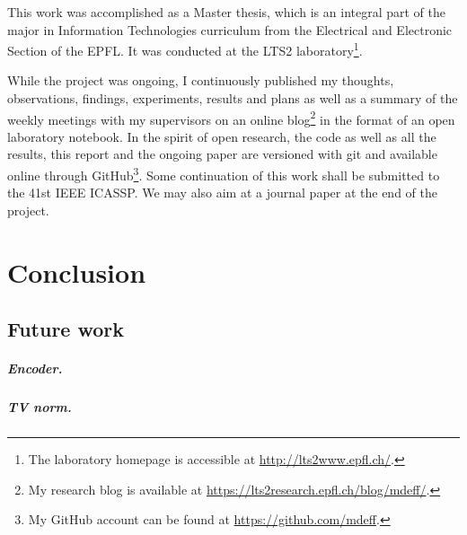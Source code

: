 \documentclass[a4paper,12pt,twoside]{report}
\begin{document}
This work was accomplished as a Master thesis, which is an integral part of the major in Information Technologies curriculum from the Electrical and Electronic Section of the \gls{EPFL}. It was conducted at the LTS2 laboratory\footnote{The laboratory homepage is accessible at \url{http://lts2www.epfl.ch/}.}.

While the project was ongoing, I continuously published my thoughts, observations, findings, experiments, results and plans as well as a summary of the weekly meetings with my supervisors on an online blog\footnote{My research blog is available at \url{https://lts2research.epfl.ch/blog/mdeff/}.} in the format of an open laboratory notebook. In the spirit of open research, the code as well as all the results, this report and the ongoing paper are versioned with git and available online through GitHub\footnote{My GitHub account can be found at \url{https://github.com/mdeff}.}. Some continuation of this work shall be submitted to the 41st IEEE \gls{ICASSP}. We may also aim at a journal paper at the end of the project.










\chapter*{Conclusion}

\section*{Future work}

\paragraph{Encoder.}

\paragraph{TV norm.}
\end{document}
